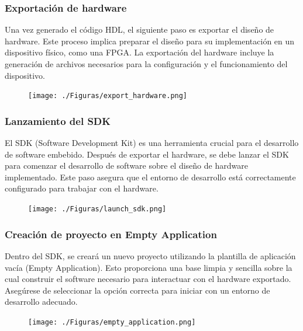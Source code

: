\documentclass[12pt,a4paper, twoside]{article} %
\begin{document}
\subsubsection{Exportación de hardware}

Una vez generado el código HDL, el siguiente paso es exportar el diseño de hardware. Este proceso implica preparar el diseño para su implementación en un dispositivo físico, como una FPGA. La exportación del hardware incluye la generación de archivos necesarios para la configuración y el funcionamiento del dispositivo.

\begin{figure}[ht]
\centering
\texttt{[image: ./Figuras/export\_hardware.png]}
\label{fig:Generar HDL}
\end{figure}

\subsubsection{Lanzamiento del SDK}

El SDK (Software Development Kit) es una herramienta crucial para el desarrollo de software embebido. Después de exportar el hardware, se debe lanzar el SDK para comenzar el desarrollo de software sobre el diseño de hardware implementado. Este paso asegura que el entorno de desarrollo está correctamente configurado para trabajar con el hardware.

\begin{figure}[ht]
\centering
\texttt{[image: ./Figuras/launch\_sdk.png]}
\label{fig:launch SDK}
\end{figure}

\subsubsection{Creación de proyecto en Empty Application}

Dentro del SDK, se creará un nuevo proyecto utilizando la plantilla de aplicación vacía (Empty Application). Esto proporciona una base limpia y sencilla sobre la cual construir el software necesario para interactuar con el hardware exportado. Asegúrese de seleccionar la opción correcta para iniciar con un entorno de desarrollo adecuado.

\begin{figure}[ht]
\centering
\texttt{[image: ./Figuras/empty\_application.png]}
\label{fig:Empty application}
\end{figure}
\end{document}
